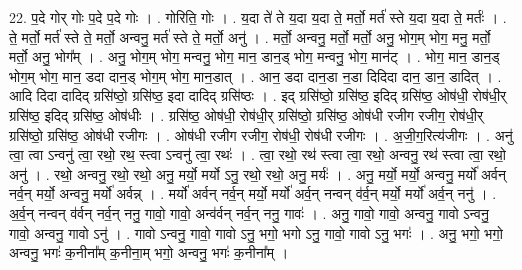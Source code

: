 \documentclass[17pt]{extarticle}
\begin{document}
22. प॒दे गोर् गोः प॒दे प॒दे गोः । . गोरिति॒ गोः । . य॒दा ते॑ ते य॒दा य॒दा ते॒ मर्तो॒ मर्त॑ स्ते य॒दा य॒दा ते॒ मर्तः॑ । . ते॒ मर्तो॒ मर्त॑ स्ते ते॒ मर्तो॒ अन्वनु॒ मर्त॑ स्ते ते॒ मर्तो॒ अनु॑ । . मर्तो॒ अन्वनु॒ मर्तो॒ मर्तो॒ अनु॒ भोग॒म् भोग॒ मनु॒ मर्तो॒ मर्तो॒ अनु॒ भोग᳚म् । . अनु॒ भोग॒म् भोग॒ मन्वनु॒ भोग॒ मान॒ डान॒ड् भोग॒ मन्वनु॒ भोग॒ मान॑ट् । . भोग॒ मान॒ डान॒ड् भोग॒म् भोग॒ मान॒ डदा दान॒ड् भोग॒म् भोग॒ मान॒डात् । . आन॒ डदा दान॒डा न॒डा दिदिदा दान॒ डान॒ डादित् । . आदि दिदा दादिद् ग्रसि॑ष्ठो॒ ग्रसि॑ष्ठ॒ इदा दादिद् ग्रसि॑ष्ठः । . इद् ग्रसि॑ष्ठो॒ ग्रसि॑ष्ठ॒ इदिद् ग्रसि॑ष्ठ॒ ओष॑धी॒ रोष॑धी॒र् ग्रसि॑ष्ठ॒ इदिद् ग्रसि॑ष्ठ॒ ओष॑धीः । . ग्रसि॑ष्ठ॒ ओष॑धी॒ रोष॑धी॒र् ग्रसि॑ष्ठो॒ ग्रसि॑ष्ठ॒ ओष॑धी रजीग रजीग॒ रोष॑धी॒र् ग्रसि॑ष्ठो॒ ग्रसि॑ष्ठ॒ ओष॑धी रजीगः । . ओष॑धी रजीग रजीग॒ रोष॑धी॒ रोष॑धी रजीगः । . अ॒जी॒ग॒रित्य॑जीगः । . अनु॑ त्वा॒ त्वा ऽन्वनु॑ त्वा॒ रथो॒ रथ॒ स्त्वा ऽन्वनु॑ त्वा॒ रथः॑ । . त्वा॒ रथो॒ रथ॑ स्त्वा त्वा॒ रथो॒ अन्वनु॒ रथ॑ स्त्वा त्वा॒ रथो॒ अनु॑ । . रथो॒ अन्वनु॒ रथो॒ रथो॒ अनु॒ मर्यो॒ मर्यो ऽनु॒ रथो॒ रथो॒ अनु॒ मर्यः॑ । . अनु॒ मर्यो॒ मर्यो॒ अन्वनु॒ मर्यो॑ अर्वन् नर्व॒न् मर्यो॒ अन्वनु॒ मर्यो॑ अर्वन्न् । . मर्यो॑ अर्वन् नर्व॒न् मर्यो॒ मर्यो॑ अर्व॒न् नन्वन् व॑र्व॒न् मर्यो॒ मर्यो॑ अर्व॒न् ननु॑ । . अ॒र्व॒न् नन्वन् व॑र्वन् नर्व॒न् ननु॒ गावो॒ गावो॒ अन्व॑र्वन् नर्व॒न् ननु॒ गावः॑ । . अनु॒ गावो॒ गावो॒ अन्वनु॒ गावो ऽन्वनु॒ गावो॒ अन्वनु॒ गावो ऽनु॑ । . गावो ऽन्वनु॒ गावो॒ गावो ऽनु॒ भगो॒ भगो ऽनु॒ गावो॒ गावो ऽनु॒ भगः॑ । . अनु॒ भगो॒ भगो॒ अन्वनु॒ भगः॑ क॒नीना᳚म् क॒नीना॒म् भगो॒ अन्वनु॒ भगः॑ क॒नीना᳚म् । \newline
\end{document}
